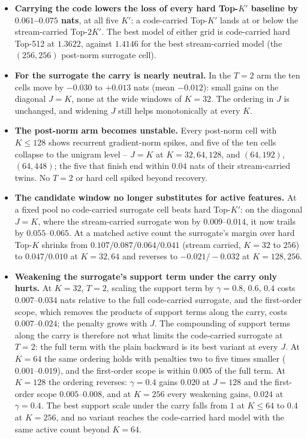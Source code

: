 \documentclass[11pt,a4paper]{article}
\newcommand{\Kp}{K'}
\begin{document}
\begin{itemize}[leftmargin=1.4em]
\item \textbf{Carrying the code lowers the loss of every hard Top-$\Kp$
baseline by $0.061$--$0.075$ nats}, at all five $\Kp$: a code-carried
Top-$\Kp$ lands at or below the stream-carried Top-$2\Kp$. The best model of
either grid is code-carried hard Top-512 at $1.3622$, against $1.4146$ for the
best stream-carried model (the $(256,256)$ post-norm surrogate cell).

\item \textbf{For the surrogate the carry is nearly neutral.} In the $T=2$
arm the ten cells move by $-0.030$ to $+0.013$ nats (mean $-0.012$): small
gains on the diagonal $J=K$, none at the wide windows of $K=32$. The ordering
in $J$ is unchanged, and widening $J$ still helps monotonically at every $K$.

\item \textbf{The post-norm arm becomes unstable.} Every post-norm cell with
$K \le 128$ shows recurrent gradient-norm spikes, and five of the ten cells
collapse to the unigram level -- $J=K$ at $K = 32, 64, 128$, and $(64,192)$,
$(64,448)$; the five that finish end within $0.04$ nats of their
stream-carried twins. No $T=2$ or hard cell spiked beyond recovery.

\item \textbf{The candidate window no longer substitutes for active
features.} At a fixed pool no code-carried surrogate cell beats hard
Top-$\Kp$: on the diagonal $J=K$, where the stream-carried surrogate won by
$0.009$--$0.014$, it now trails by $0.055$--$0.065$. At a matched active count
the surrogate's margin over hard Top-$K$ shrinks from $0.107 / 0.087 / 0.064
/ 0.041$ (stream carried, $K = 32$ to $256$) to $0.047 / 0.010$ at $K = 32,
64$ and reverses to $-0.021 / -0.032$ at $K = 128, 256$.

\item \textbf{Weakening the surrogate's support term under the carry only
hurts.} At $K=32$, $T=2$, scaling the support term by $\gamma = 0.8$, $0.6$,
$0.4$ costs $0.007$--$0.034$ nats relative to the full code-carried
surrogate, and the first-order scope, which removes the products of support
terms along the carry, costs $0.007$--$0.024$; the penalty grows with $J$.
The compounding of support terms along the carry is therefore not what
limits the code-carried surrogate at $T=2$: the full term with the plain
backward is its best variant at every $J$. At $K = 64$ the same ordering
holds with penalties two to five times smaller ($0.001$--$0.019$), and the
first-order scope is within $0.005$ of the full term. At $K = 128$ the
ordering reverses: $\gamma = 0.4$ gains $0.020$ at $J = 128$ and the
first-order scope $0.005$--$0.008$, and at $K = 256$ every weakening
gains, $0.024$ at $\gamma = 0.4$. The best support scale under the carry
falls from $1$ at $K \le 64$ to $0.4$ at $K = 256$, and no variant reaches
the code-carried hard model with the same active count beyond $K = 64$.
\end{itemize}
\end{document}
